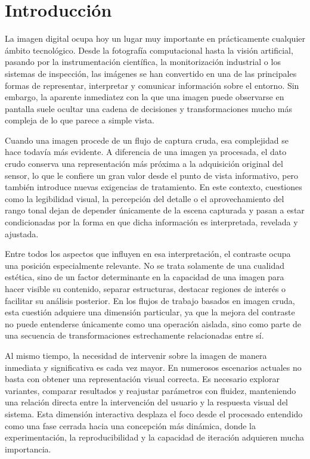 \section{Introducción} \label{sec:1_introduccion}

La imagen digital ocupa hoy un lugar muy importante en prácticamente cualquier ámbito
tecnológico. Desde la fotografía computacional hasta la visión artificial, pasando
por la instrumentación científica, la monitorización industrial o los sistemas de
inspección, las imágenes se han convertido en una de las principales formas de
representar, interpretar y comunicar información sobre el entorno. Sin embargo,
la aparente inmediatez con la que una imagen puede observarse en pantalla suele
ocultar una cadena de decisiones y transformaciones mucho más compleja de lo que
parece a simple vista.

Cuando una imagen procede de un flujo de captura cruda, esa complejidad se hace
todavía más evidente. A diferencia de una imagen ya procesada, el dato
crudo conserva una representación más próxima a la adquisición original del
sensor, lo que le confiere un gran valor desde el punto de vista informativo, pero
también introduce nuevas exigencias de tratamiento. En este contexto, cuestiones
como la legibilidad visual, la percepción del detalle o el aprovechamiento del
rango tonal dejan de depender únicamente de la escena capturada y pasan a estar
condicionadas por la forma en que dicha información es interpretada, revelada y
ajustada.

Entre todos los aspectos que influyen en esa interpretación, el contraste ocupa
una posición especialmente relevante. No se trata solamente de una cualidad
estética, sino de un factor determinante en la capacidad de una imagen para hacer
visible su contenido, separar estructuras, destacar regiones de interés o facilitar
su análisis posterior. En los flujos de trabajo basados en imagen cruda, 
esta cuestión adquiere una dimensión particular, ya que la mejora del contraste 
no puede entenderse únicamente como una operación aislada, sino como parte de una secuencia 
de transformaciones estrechamente relacionadas entre sí.

Al mismo tiempo, la necesidad de intervenir sobre la imagen de manera inmediata y
significativa es cada vez mayor. En numerosos escenarios actuales no basta con
obtener una representación visual correcta. Es necesario explorar variantes,
comparar resultados y reajustar parámetros con fluidez, manteniendo una relación
directa entre la intervención del usuario y la respuesta visual del sistema. Esta
dimensión interactiva desplaza el foco desde el procesado entendido como una fase
cerrada hacia una concepción más dinámica, donde la experimentación, la
reproducibilidad y la capacidad de iteración adquieren mucha importancia.

